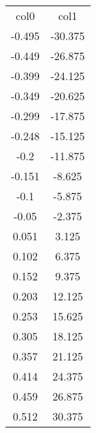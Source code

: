 \begin{table}
\begin{tabular}{cc}
col0 & col1 \\
-0.495 & -30.375 \\
-0.449 & -26.875 \\
-0.399 & -24.125 \\
-0.349 & -20.625 \\
-0.299 & -17.875 \\
-0.248 & -15.125 \\
-0.2 & -11.875 \\
-0.151 & -8.625 \\
-0.1 & -5.875 \\
-0.05 & -2.375 \\
0.051 & 3.125 \\
0.102 & 6.375 \\
0.152 & 9.375 \\
0.203 & 12.125 \\
0.253 & 15.625 \\
0.305 & 18.125 \\
0.357 & 21.125 \\
0.414 & 24.375 \\
0.459 & 26.875 \\
0.512 & 30.375 \\
\end{tabular}
\end{table}
